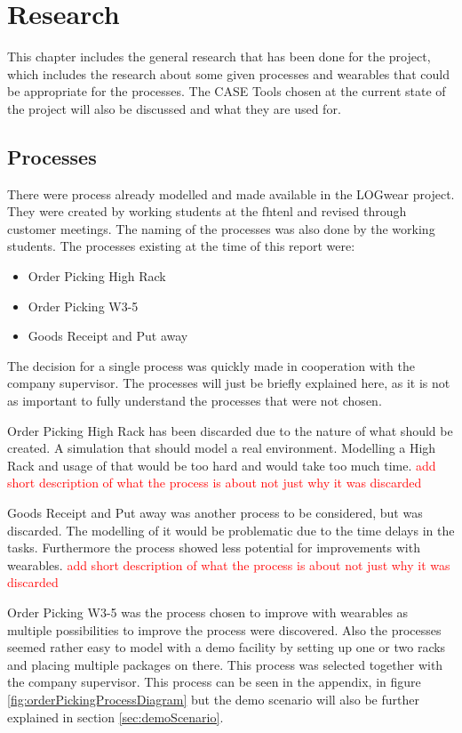 \chapter{Research}\label{cha:research}
This chapter includes the general research that has been done for the project, which includes the research about some given processes and wearables that could be appropriate for the processes. The CASE Tools chosen at the current state of the project will also be discussed and what they are used for.

\section{Processes}\label{sec:processes}
There were process already modelled and made available in the LOGwear project. They were created by working students at the \gls{fhtenl} and revised through customer meetings. The naming of the processes was also done by the working students. The processes existing at the time of this report were:

\begin{itemize}
	\item Order Picking High Rack
	\item Order Picking W3-5
	\item Goods Receipt and Put away
\end{itemize}

The decision for a single process was quickly made in cooperation with the company supervisor. The processes will just be briefly explained here, as it is not as important to fully understand the processes that were not chosen.

Order Picking High Rack has been discarded due to the nature of what should be created. A simulation that should model a real environment. Modelling a High Rack and usage of that would be too hard and would take too much time. \textcolor{red}{add short description of what the process is about not just why it was discarded}

Goods Receipt and Put away was another process to be considered, but was discarded. The modelling of it would be problematic due to the time delays in the tasks. Furthermore the process showed less potential for improvements with wearables. \textcolor{red}{add short description of what the process is about not just why it was discarded}

Order Picking W3-5 was the process chosen to improve with wearables as multiple possibilities to improve the process were discovered. Also the processes seemed rather easy to model with a demo facility by setting up one or two racks and placing multiple packages on there. This process was selected together with the company supervisor. This process can be seen in the appendix, in figure \ref{fig:orderPickingProcessDiagram} but the demo scenario will also be further explained in section \ref{sec:demoScenario}.

